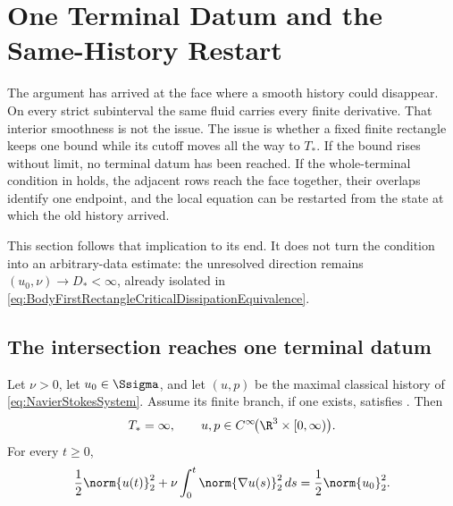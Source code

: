 \clearpage
\section{One Terminal Datum and the Same-History Restart}\label{sec:TheMissingEstimateAndGlobalSmoothness}

The argument has arrived at the face where a smooth history could disappear.
On every strict subinterval the same fluid carries every finite derivative.
That interior smoothness is not the issue.  The issue is whether a fixed finite
rectangle keeps one bound while its cutoff moves all the way to \(T_*\).  If
the bound rises without limit, no terminal datum has been reached.  If the
whole-terminal condition in
 holds, the adjacent rows reach
the face together, their overlaps identify one endpoint, and the local
equation can be restarted from the state at which the old history arrived.

This section follows that implication to its end.  It does not turn the
condition into an arbitrary-data estimate: the unresolved direction remains
\((u_0,\nu)\to D_*<\infty\), already isolated in
\eqref{eq:BodyFirstRectangleCriticalDissipationEquivalence}.

\subsection{The intersection reaches one terminal datum}\label{sub:NoFiniteSingularTime}

\begin{theorem}\label{thm:MainGlobalRegularity}
Let \(\nu>0\), let \(u_0\in\Ssigma\), and let \((u,p)\) be the maximal
classical history of \eqref{eq:NavierStokesSystem}.  Assume its finite branch,
if one exists, satisfies
.  Then
\begin{equation}\label{eq:BodyGlobalSmoothnessConclusion}
  T_*=\infty,
  \qquad
  u,p\in C^\infty\!\bigl(\R^3\times[0,\infty)\bigr).
\end{equation}
For every \(t\geq0\),
\begin{equation}\label{eq:GlobalEnergyConclusion}
  \frac12\norm{u(t)}_2^2
  +\nu\int_0^t\norm{\nabla u(s)}_2^2\,ds
  =\frac12\norm{u_0}_2^2.
\end{equation}
\end{theorem}

